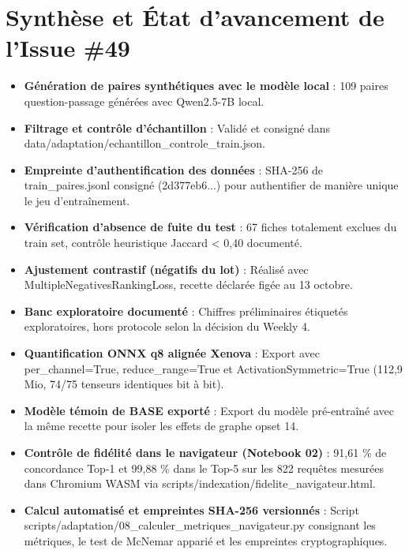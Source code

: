 \documentclass[11pt,a4paper]{article}
\newcommand{\code}[1]  {{\ttfamily #1}}
\begin{document}
\section{Synthèse et État d'avancement de l'Issue \#49}
\begin{itemize}
\item [x] \textbf{Génération de paires synthétiques avec le modèle local} : 109 paires question-passage générées avec Qwen2.5-7B local.
\item [x] \textbf{Filtrage et contrôle d'échantillon} : Validé et consigné dans \code{data/\allowbreak{}adaptation/\allowbreak{}echantillon\_\allowbreak{}controle\_\allowbreak{}train.\allowbreak{}json}.
\item [x] \textbf{Empreinte d'authentification des données} : SHA-256 de \code{train\_\allowbreak{}paires.\allowbreak{}jsonl} consigné (\code{2d377eb6.\allowbreak{}.\allowbreak{}.\allowbreak{}}) pour authentifier de manière unique le jeu d'entraînement.
\item [x] \textbf{Vérification d'absence de fuite du test} : 67 fiches totalement exclues du train set, contrôle heuristique Jaccard < 0,40 documenté.
\item [x] \textbf{Ajustement contrastif (négatifs du lot)} : Réalisé avec \code{MultipleNegativesRankingLoss}, recette déclarée figée au 13 octobre.
\item [x] \textbf{Banc exploratoire documenté} : Chiffres préliminaires étiquetés \og exploratoires, hors protocole\fg{} selon la décision du Weekly 4.
\item [x] \textbf{Quantification ONNX q8 alignée Xenova} : Export avec \code{per\_\allowbreak{}channel=True}, \code{reduce\_\allowbreak{}range=True} et \code{ActivationSymmetric=True} (112,9 Mio, 74/75 tenseurs identiques bit à bit).
\item [x] \textbf{Modèle témoin de BASE exporté} : Export du modèle pré-entraîné avec la même recette pour isoler les effets de graphe opset 14.
\item [x] \textbf{Contrôle de fidélité dans le navigateur (Notebook 02)} : 91,61 \% de concordance Top-1 et 99,88 \% dans le Top-5 sur les 822 requêtes mesurées dans Chromium WASM via \code{scripts/\allowbreak{}indexation/\allowbreak{}fidelite\_\allowbreak{}navigateur.\allowbreak{}html}.
\item [x] \textbf{Calcul automatisé et empreintes SHA-256 versionnés} : Script \code{scripts/\allowbreak{}adaptation/\allowbreak{}08\_\allowbreak{}calculer\_\allowbreak{}metriques\_\allowbreak{}navigateur.\allowbreak{}py} consignant les métriques, le test de McNemar apparié et les empreintes cryptographiques.

\end{itemize}
\end{document}
